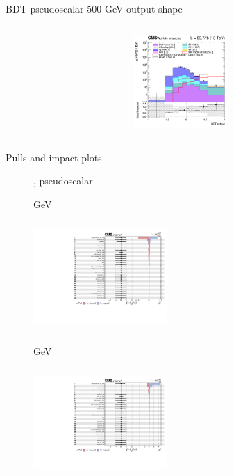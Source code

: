 \documentclass[8pt]{beamer}
\begin{document}
\begin{frame}{BDT pseudoscalar 500 GeV output shape}
\begin{columns}
\begin{column}{0.33\textwidth}
\begin{center}
     			\includegraphics[width=1.0\textwidth, height=100pt]{figs/2018/SmearSR-ttDM-pseudo500/log_cratio_topCR_ll_TTbar_BDT_output_pseudoscalar500_customBinsAttempt7.png}
    		\end{center}		
		\end{column}
\end{columns} \vfill
\end{frame}


\begin{frame}{Pulls and impact plots}
\justifying
\begin{figure}[htbp]
\centering
\begin{block}{, pseudoscalar}\end{block}	\vspace{-8pt}

\begin{minipage}[b]{0.49\textwidth}
\begin{center}
\centering \begin{block}{ GeV}\end{block}	
\includegraphics[width=5.1cm, height=4.2cm]{figs/2016/impacts_2016_both_pseudo_100.pdf}
\end{center}
\end{minipage}\hfill
\begin{minipage}[b]{0.49\textwidth}
\begin{center}
\centering \begin{block}{ GeV}\end{block}	
\includegraphics[width=5.1cm, height=4.2cm]{figs/2016/impacts_2016_both_pseudo_500.pdf}
\end{center}
\end{minipage} \hfill
\end{figure}
\end{frame}
\end{document}
